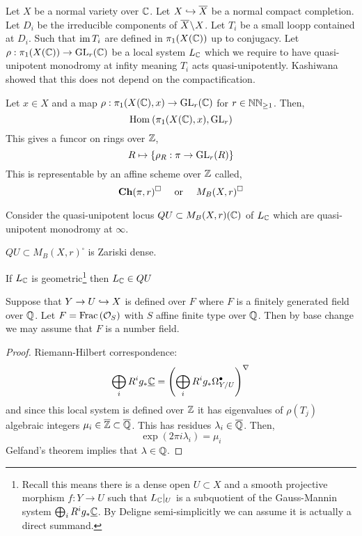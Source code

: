 \documentclass[12pt]{article}
\begin{document}
Let $X$ be a normal variety over $\mathbb{C}$. Let $X \hookrightarrow \overline{X}$ be a normal compact completion. Let $D_i$ be the irreducible components of $\overline{X} \! \setminus \! X$. Let $T_i$ be a small loopp contained at $D_i$. Such that $\operatorname{\mathrm{im}}{T_i}$ are defined in $\pi_1(X(\mathbb{C}))$ up to conjugacy. Let $\rho : \pi_1(X(\mathbb{C})) \to \mathrm{GL}_r(\mathbb{C})$ be a local system $L_{\mathbb{C}}$ which we require to have quasi-unipotent monodromy at infity meaning $T_i$ acts quasi-unipotently. Kashiwana showed that this does not depend on the compactification.

\begin{defn}
Let $x \in X$ and a map $\rho : \pi_1(X(\mathbb{C}), x) \to \mathrm{GL}_r(\mathbb{C})$ for $r \in \mathbb{NN}_{\ge 1}$. Then,
\[ \mathrm{Hom}_{} \left( \pi_1(X(\mathbb{C}), x), \mathrm{GL}_r \right) \]
This gives a funcor on rings over $\mathbb{Z}$,
\[ R \mapsto \{ \rho_{R} : \pi \to \mathrm{GL}_r(R) \} \]
This is representable by an affine scheme over $\mathbb{Z}$ called,
\[ \mathbf{Ch}(\pi, r)^{\square} \quad \text{ or } \quad M_B(X, r)^{\square} \]
\end{defn}

\begin{defn}
Consider the quasi-unipotent locus $QU \subset M_B(X, r)(\mathbb{C})$ of $L_{\mathbb{C}}$ which are quasi-unipotent monodromy at $\infty$.
\end{defn}

\begin{theorem}[E-M. Kerz, 20] 
$QU \subset M_B(X, r)^{\square}$ is Zariski dense. 
\end{theorem}

\begin{theorem}[Grothendieck]
If $L_{\mathbb{C}}$ is geometric\footnote{Recall this means there is a dense open $U \subset X$ and a smooth projective morphism $f : Y \to U$ such that $L_{\mathbb{C}}|_U$ is a subquotient of the Gauss-Mannin system $\bigoplus_{i} R^i g_* \underline{\mathbb{C}}$. By Deligne semi-simplicitly we can assume it is actually a direct summand.} then $L_{\mathbb{C}} \in QU$
\end{theorem}

\begin{theorem}[Briskorn]
Suppose that $Y \to U \hookrightarrow X$ is defined over $F$ where $F$ is a finitely generated field over $\mathbb{Q}$. Let $F = \mathrm{Frac}\left(\mathcal{O}_{S}\right)$ with $S$ affine finite type over $\mathbb{Q}$. Then by base change we may assume that $F$ is a number field. 
\end{theorem}

\begin{proof}
Riemann-Hilbert correspondence:
\[ \bigoplus_{i} R^i g_* \underline{\mathbb{C}}  = \left( \bigoplus_{i} R^i g_* \Omega^\bullet_{Y/U} \right)^{\nabla} \]
and since this local system is defined over $\mathbb{Z}$ it has eigenvalues of $\rho(T_j)$ algebraic integers $\mu_i \in \overline{\mathbb{Z}} \subset \overline{\mathbb{Q}}$. This has residues $\lambda_i \in \overline{\mathbb{Q}}$. Then,
\[ \exp(2 \pi i \lambda_i) = \mu_i \] 
Gelfand's theorem implies that $\lambda \in \mathbb{Q}$. 
\end{proof}
\end{document}
